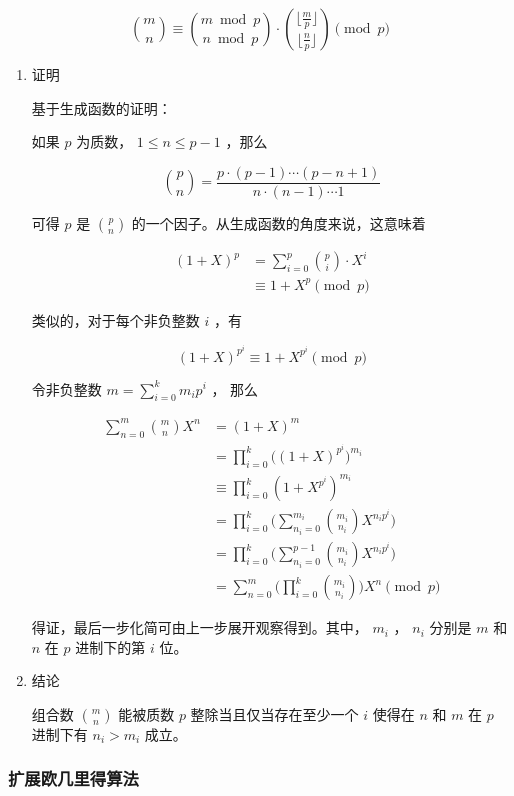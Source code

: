\documentclass[11pt]{article}
\begin{document}
$$
\binom{m}{n} \equiv \binom{m \bmod p}{n \bmod p} \cdot \binom{\lfloor\frac{m}{p} \rfloor}{\lfloor \frac{n}{p} \rfloor} \pmod p
$$


\begin{enumerate}
\item 证明
\label{sec-3-3-2-1}

基于生成函数的证明：

如果 $p$ 为质数， $1\leq n \leq p-1$ ，那么

$$
\binom{p}{n} = \frac{p \cdot (p - 1) \cdots (p - n + 1)}{n \cdot (n - 1) \cdots 1}
$$

可得 $p$  是 $\binom{p}{n}$ 的一个因子。从生成函数的角度来说，这意味着

$$ \begin{aligned}
(1 + X)^p &= \sum_{i=0}^p \binom{p}{i}\cdot X^i\\
&\equiv 1+X^p \pmod p
\end{aligned} $$

类似的，对于每个非负整数 $i$ ，有

$$
(1+X)^{p^i} \equiv 1 + X^{p^i} \pmod p
$$

令非负整数 $m=\sum_{i=0}^k m_i p^i$ ， 那么

$$ \begin{aligned}
\sum_{n=0}^m \binom{m}{n}X^n &= (1 + X)^m \\
&=\prod_ {i=0}^k \Big ((1+X)^{p^i} \Big) ^{m_i}\\
&\equiv \prod_{i=0}^k(1+X^{p^i})^{m_i}\\
&=\prod_{i=0}^k\bigg ( \sum_{n_i=0}^{m_i} \binom{m_i}{n_i}X^{n_i p^i} \bigg)\\
&=\prod_{i=0}^k \bigg (\sum_{n_i=0}^{p-1} \binom{m_i}{n_i}X^{n_ip^i} \bigg)\\
&=\sum_{n=0}^m \bigg(\prod_{i=0}^k \binom{m_i}{n_i} \bigg) X^n \pmod p
\end{aligned} $$

得证，最后一步化简可由上一步展开观察得到。其中， $m_i$ ， $n_i$ 分别是 $m$ 和 $n$ 在 $p$ 进制下的第 $i$ 位。

\item 结论
\label{sec-3-3-2-2}

组合数 $\binom{m}{n}$ 能被质数 $p$ 整除当且仅当存在至少一个 $i$ 使得在 $n$ 和 $m$ 在 $p$ 进制下有 $n_i > m_i$ 成立。
\end{enumerate}
\subsubsection{扩展欧几里得算法}
\label{sec-3-3-3}
\end{document}

